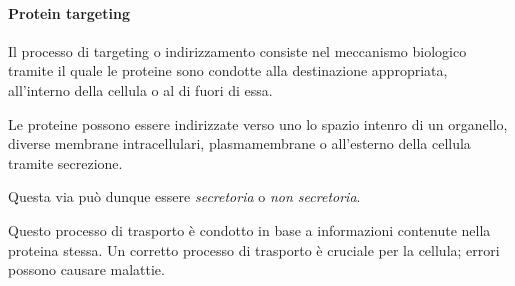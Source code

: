 \documentclass[]{article}
\begin{document}
\paragraph{Protein targeting}\label{protein-targeting}

Il processo di targeting o indirizzamento consiste nel meccanismo
biologico tramite il quale le proteine sono condotte alla destinazione
appropriata, all'interno della cellula o al di fuori di essa.

Le proteine possono essere indirizzate verso uno lo spazio intenro di un
organello, diverse membrane intracellulari, plasmamembrane o all'esterno
della cellula tramite secrezione.

Questa via può dunque essere \emph{secretoria} o \emph{non secretoria}.

Questo processo di trasporto è condotto in base a informazioni contenute
nella proteina stessa. Un corretto processo di trasporto è cruciale per
la cellula; errori possono causare malattie.
\end{document}
